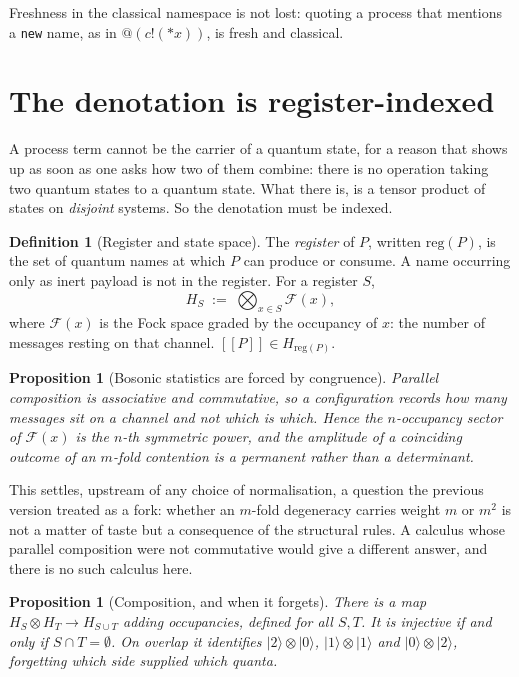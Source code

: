 \documentclass[11pt,a4paper]{article}
\theoremstyle{plain}
\newtheorem{proposition}[theorem]{Proposition}
\theoremstyle{definition}
\newtheorem{definition}[theorem]{Definition}
\theoremstyle{remark}
\newcommand{\sem}[1]{[\![#1]\!]}
\newcommand{\ket}[1]{\lvert #1 \rangle}
\begin{document}
Freshness in the classical namespace is not lost: quoting a process that
mentions a \texttt{new} name, as in $@(c!(*x))$, is fresh and classical.

\section{The denotation is register-indexed}\label{sec:register}

A process term cannot be the carrier of a quantum state, for a reason that shows
up as soon as one asks how two of them combine: there is no operation taking two
quantum states to a quantum state. What there is, is a tensor product of states
on \emph{disjoint} systems. So the denotation must be indexed.

\begin{definition}[Register and state space]\label{def:register}
The \emph{register} of $P$, written $\mathrm{reg}(P)$, is the set of quantum
names at which $P$ can produce or consume. A name occurring only as inert
payload is not in the register. For a register $S$,
\[
  H_S \;:=\; \bigotimes_{x \in S} \mathcal{F}(x),
\]
where $\mathcal{F}(x)$ is the Fock space graded by the occupancy of $x$: the
number of messages resting on that channel. $\sem{P} \in H_{\mathrm{reg}(P)}$.
\end{definition}

\begin{proposition}[Bosonic statistics are forced by
congruence]\label{prop:bose}
Parallel composition is associative and commutative, so a configuration records
how many messages sit on a channel and not which is which. Hence the
$n$-occupancy sector of $\mathcal{F}(x)$ is the $n$-th \emph{symmetric} power,
and the amplitude of a coinciding outcome of an $m$-fold contention is a
permanent rather than a determinant.
\end{proposition}

This settles, upstream of any choice of normalisation, a question the previous
version treated as a fork: whether an $m$-fold degeneracy carries weight $m$ or
$m^2$ is not a matter of taste but a consequence of the structural rules. A
calculus whose parallel composition were not commutative would give a different
answer, and there is no such calculus here.

\begin{proposition}[Composition, and when it forgets]\label{prop:compose}
There is a map $H_S \otimes H_T \to H_{S \cup T}$ adding occupancies, defined
for all $S, T$. It is injective if and only if $S \cap T = \emptyset$. On
overlap it identifies $\ket{2}\otimes\ket{0}$, $\ket{1}\otimes\ket{1}$ and
$\ket{0}\otimes\ket{2}$, forgetting which side supplied which quanta.
\end{proposition}
\end{document}
